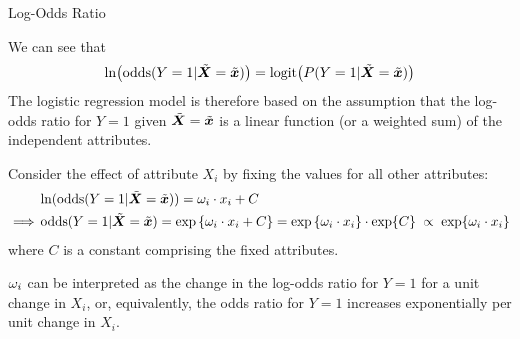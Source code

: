 \begin{frame}{Log-Odds Ratio}

We can see that 
\begin{align*}
    \ln\bigl(\operatorname{odds}(Y=1|\tilde{{\boldsymbol X}}=\tilde{{\boldsymbol x}})\bigr) =
    \text{logit}\bigl(P(Y=1|\tilde{{\boldsymbol X}}=\tilde{{\boldsymbol x}})\bigr)
\end{align*}
%
The logistic regression model is therefore based on the assumption that
the log-odds ratio for $Y=1$ given  $\tilde{{\boldsymbol X}}=\tilde{{\boldsymbol x}}$ is a linear function (or a
weighted sum) of the independent attributes. 
\medskip

Consider the effect of attribute $X_i$ by fixing
the values for all other attributes:%
\begin{align*}
    & \ln(\operatorname{odds}(Y=1|\tilde{{\boldsymbol X}}=\tilde{{\boldsymbol x}})) = \omega_i \cdot x_i + C\\
    \implies & \operatorname{odds}(Y=1|\tilde{{\boldsymbol X}}=\tilde{{\boldsymbol x}}) = \exp\left\{\omega_i \cdot x_i + C\right\} =
    \exp\left\{\omega_i \cdot x_i\right\} \cdot
    \exp\{C\} \; \propto \; \exp\{\omega_i \cdot x_i\}
\end{align*}
where $C$ is a constant comprising the fixed attributes.

\medskip

$\omega_i$ can be interpreted as the change in the log-odds ratio for $Y=1$ for
a unit change in $X_i$, or, equivalently, the odds ratio for $Y=1$ increases
exponentially per unit change in $X_i$.  
\end{frame}
%
%

